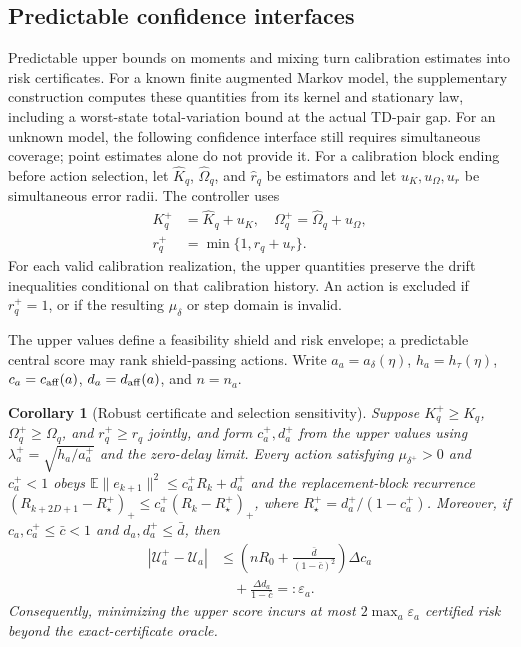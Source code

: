 \documentclass[journal]{IEEEtran}
\newtheorem{corollary}{Corollary}
\newcommand{\E}{\mathbb{E}}
\begin{document}
\subsection{Predictable confidence interfaces}
Predictable upper bounds on moments and mixing turn calibration estimates into risk certificates.
For a known finite augmented Markov model, the supplementary construction computes these quantities from its kernel and stationary law, including a worst-state total-variation bound at the actual TD-pair gap.
For an unknown model, the following confidence interface still requires simultaneous coverage; point estimates alone do not provide it.
For a calibration block ending before action selection, let $\widehat K_q$, $\widehat\Omega_q$, and $\widehat r_q$ be estimators and let $u_K,u_\Omega,u_r$ be simultaneous error radii.
The controller uses
\begin{align}
K_q^+&=\widehat K_q+u_K,\quad
\Omega_q^+=\widehat\Omega_q+u_\Omega,\nonumber\\
r_q^+&=\min\{1,\widehat r_q+u_r\}.
\label{eq:upper-interfaces}
\end{align}
For each valid calibration realization, the upper quantities preserve the drift inequalities conditional on that calibration history.
An action is excluded if $r_q^+=1$, or if the resulting $\mu_\delta$ or step domain is invalid.

The upper values define a feasibility shield and risk envelope; a predictable central score may rank shield-passing actions.
Write $a_a=a_\delta(\eta)$, $h_a=h_\tau(\eta)$, $c_a=c_{\rm aff}(a)$, $d_a=d_{\rm aff}(a)$, and $n=n_a$.

\begin{corollary}[Robust certificate and selection sensitivity]
Suppose $K_q^+\ge K_q$, $\Omega_q^+\ge\Omega_q$, and $r_q^+\ge r_q$ jointly, and form $c_a^+,d_a^+$ from the upper values using $\lambda_a^+=\sqrt{h_a/a_a^+}$ and the zero-delay limit.
Every action satisfying $\mu_{\delta^+}>0$ and $c_a^+<1$ obeys $\E\|e_{k+1}\|^2\le c_a^+R_k+d_a^+$ and the replacement-block recurrence $(R_{k+2D+1}-R_\star^+)_+\le c_a^+(R_k-R_\star^+)_+$, where $R_\star^+=d_a^+/(1-c_a^+)$.
Moreover, if $c_a,c_a^+\le\bar c<1$ and $d_a,d_a^+\le\bar d$, then
\begin{align}
|\mathcal U_a^+-\mathcal U_a|
&\le\left(nR_0+\frac{\bar d}{(1-\bar c)^2}\right)\Delta c_a\nonumber\\
&\quad+\frac{\Delta d_a}{1-\bar c}=: \varepsilon_a.
\label{eq:robust-score-gap}
\end{align}
Consequently, minimizing the upper score incurs at most $2\max_a\varepsilon_a$ certified risk beyond the exact-certificate oracle.
\label{cor:robust-certificate}
\end{corollary}
\end{document}
